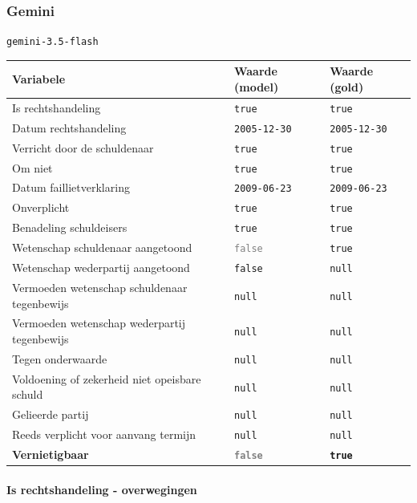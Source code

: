 \documentclass[
  dutch,
  a4paper,
]{article}
\begin{document}
\newpage


\subsubsection{Gemini}\label{gemini}

\texttt{gemini-3.5-flash}

\begin{center}
\small
\begin{tabular}{@{}p{7.4cm}p{2.6cm}p{2.6cm}@{}}
\toprule
Variabele & Waarde (model) & Waarde (gold) \\
\midrule
Is rechtshandeling & \texttt{true} & \texttt{true} \\
Datum rechtshandeling & \texttt{2005-12-30} & \texttt{2005-12-30} \\
Verricht door de schuldenaar & \texttt{true} & \texttt{true} \\
Om niet & \texttt{true} & \texttt{true} \\
Datum faillietverklaring & \texttt{2009-06-23} & \texttt{2009-06-23} \\
Onverplicht & \texttt{true} & \texttt{true} \\
Benadeling schuldeisers & \texttt{true} & \texttt{true} \\
Wetenschap schuldenaar aangetoond & \textcolor{gray}{\texttt{false}} & \texttt{true} \\
Wetenschap wederpartij aangetoond & \texttt{false} & \texttt{null} \\
Vermoeden wetenschap schuldenaar tegenbewijs & \texttt{null} & \texttt{null} \\
Vermoeden wetenschap wederpartij tegenbewijs & \texttt{null} & \texttt{null} \\
Tegen onderwaarde & \texttt{null} & \texttt{null} \\
Voldoening of zekerheid niet opeisbare schuld & \texttt{null} & \texttt{null} \\
Gelieerde partij & \texttt{null} & \texttt{null} \\
Reeds verplicht voor aanvang termijn & \texttt{null} & \texttt{null} \\
\textbf{Vernietigbaar} & \textbf{\textcolor{gray}{\texttt{false}}} & \textbf{\texttt{true}} \\
\bottomrule
\end{tabular}
\end{center}

\paragraph{Is rechtshandeling - overwegingen}\label{is-rechtshandeling---overwegingen-2}
\end{document}
